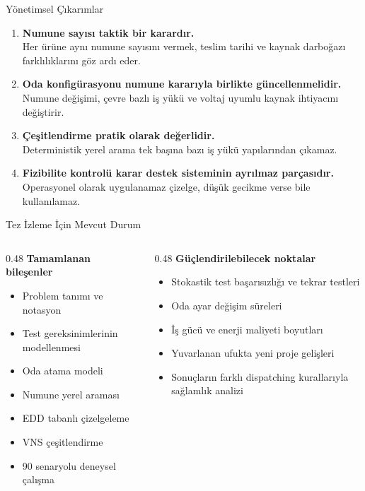 \documentclass[aspectratio=169,11pt]{beamer}
\begin{document}
\begin{frame}{Yönetimsel Çıkarımlar}
  \begin{enumerate}
    \item \textbf{Numune sayısı taktik bir karardır.}\\
    Her ürüne aynı numune sayısını vermek, teslim tarihi ve kaynak darboğazı farklılıklarını göz ardı eder.

    \item \textbf{Oda konfigürasyonu numune kararıyla birlikte güncellenmelidir.}\\
    Numune değişimi, çevre bazlı iş yükü ve voltaj uyumlu kaynak ihtiyacını değiştirir.

    \item \textbf{Çeşitlendirme pratik olarak değerlidir.}\\
    Deterministik yerel arama tek başına bazı iş yükü yapılarından çıkamaz.

    \item \textbf{Fizibilite kontrolü karar destek sisteminin ayrılmaz parçasıdır.}\\
    Operasyonel olarak uygulanamaz çizelge, düşük gecikme verse bile kullanılamaz.
  \end{enumerate}
\end{frame}

\begin{frame}{Tez İzleme İçin Mevcut Durum}
  \begin{columns}[T,totalwidth=\textwidth]
    \begin{column}{0.48\textwidth}
      \textbf{Tamamlanan bileşenler}
      \begin{itemize}
        \item Problem tanımı ve notasyon
        \item Test gereksinimlerinin modellenmesi
        \item Oda atama modeli
        \item Numune yerel araması
        \item EDD tabanlı çizelgeleme
        \item VNS çeşitlendirme
        \item 90 senaryolu deneysel çalışma
      \end{itemize}
    \end{column}
    \begin{column}{0.48\textwidth}
      \textbf{Güçlendirilebilecek noktalar}
      \begin{itemize}
        \item Stokastik test başarısızlığı ve tekrar testleri
        \item Oda ayar değişim süreleri
        \item İş gücü ve enerji maliyeti boyutları
        \item Yuvarlanan ufukta yeni proje gelişleri
        \item Sonuçların farklı dispatching kurallarıyla sağlamlık analizi
      \end{itemize}
    \end{column}
  \end{columns}
\end{frame}
\end{document}

